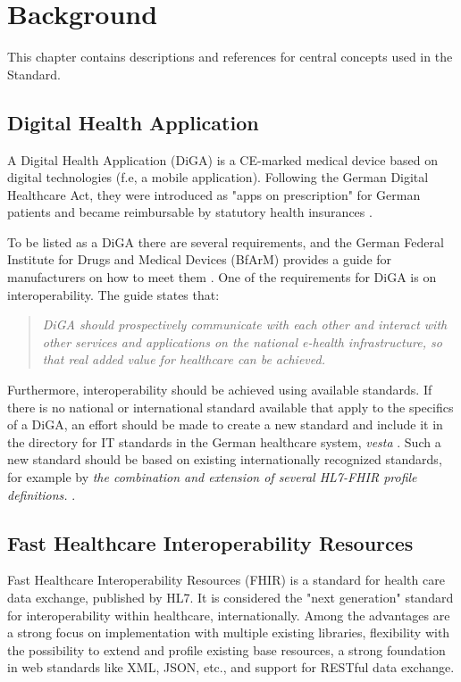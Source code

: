 \documentclass[12px]{report}
\newcommand{\fhir}{FHIR\textsuperscript{\textregistered}}
\newcommand{\hl}{HL7\textsuperscript{\textregistered}}
\begin{document}
\chapter{Background}
\label{ch:bg}

This chapter contains descriptions and references for central concepts used in the Standard.

\section{Digital Health Application}
A Digital Health Application (DiGA) is a CE-marked medical device based on digital technologies (f.e, a mobile application). Following the German Digital Healthcare Act, they were introduced as "apps on prescription" for German patients and became reimbursable by statutory health insurances \cite{diga}.

To be listed as a DiGA there are several requirements, and the German Federal Institute for Drugs and Medical Devices (BfArM) provides a guide for manufacturers on how to meet them \cite{guide}.
One of the requirements for DiGA is on interoperability. The guide \cite[p.51]{guide} states that:

\begin{quotation}
    \noindent \textit{DiGA should prospectively communicate with each other and interact with other services and applications on the national e-health infrastructure, so that real added value for healthcare can be achieved.}
\end{quotation}

Furthermore, interoperability should be achieved using available standards. If there is no national or international standard available that apply to the specifics of a DiGA, an effort should be made to create a new standard and include it in the directory for IT standards in the German healthcare system, \textit{vesta} \cite{vesta}.
Such a new standard should be based on existing internationally recognized standards, for example by \textit{the combination and extension of several HL7-FHIR profile definitions.} \cite[p.53-54]{guide}.

\section{Fast Healthcare Interoperability Resources}
Fast Healthcare Interoperability Resources (\fhir) \cite{FHIR} is a standard for health care data exchange, published by \hl. It is considered the "next generation" standard for interoperability within healthcare, internationally.
Among the advantages are a strong focus on implementation with multiple existing libraries, flexibility with the possibility to extend and profile existing base resources, a strong foundation in web standards like XML, JSON, etc., and support for RESTful data exchange.
\end{document}
